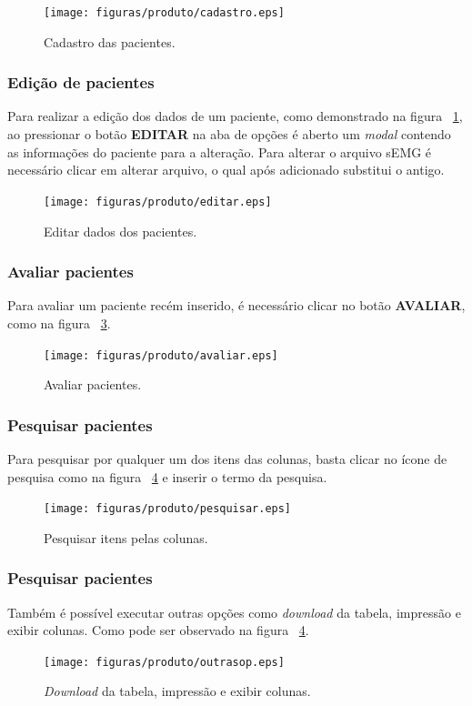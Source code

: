 \begin{figure}[!htb]
    \centering
    \texttt{[image: figuras/produto/cadastro.eps]}
    \caption{Cadastro das pacientes.}
    \label{figcadastro}
\end{figure}

\subsubsection{Edição de pacientes}
Para realizar a edição dos dados de um paciente, como demonstrado na figura ~\ref{figcadastro}, ao pressionar o botão \textbf{EDITAR} na aba de opções é aberto um \textit{modal} contendo as informações do paciente para a alteração. Para alterar o arquivo sEMG é necessário clicar em alterar arquivo, o qual após adicionado substitui o antigo.

\begin{figure}[!htb]
    \centering
    \texttt{[image: figuras/produto/editar.eps]}
    \caption{Editar dados dos pacientes.}
    \label{figeditar}
\end{figure}

\subsubsection{Avaliar pacientes}
Para avaliar um paciente recém inserido, é necessário clicar no botão \textbf{AVALIAR}, como na figura ~\ref{figavaliar}.
\begin{figure}[!htb]
    \centering
    \texttt{[image: figuras/produto/avaliar.eps]}
    \caption{Avaliar pacientes.}
    \label{figavaliar}
\end{figure}

\subsubsection{Pesquisar pacientes}
Para pesquisar por qualquer um dos itens das colunas, basta clicar no ícone de pesquisa como na figura ~\ref{figpesquisar} e inserir o termo da pesquisa.
\begin{figure}[!htb]
    \centering
    \texttt{[image: figuras/produto/pesquisar.eps]}
    \caption{Pesquisar itens pelas colunas.}
    \label{figpesquisar}
\end{figure}

\subsubsection{Pesquisar pacientes}
Também é possível executar outras opções como \textit{download} da tabela, impressão e exibir colunas. Como pode ser observado na figura ~\ref{figpesquisar}.
\begin{figure}[!htb]
    \centering
    \texttt{[image: figuras/produto/outrasop.eps]}
    \caption{\textit{Download} da tabela, impressão e exibir colunas.}
    \label{figoutrasop}
\end{figure}

